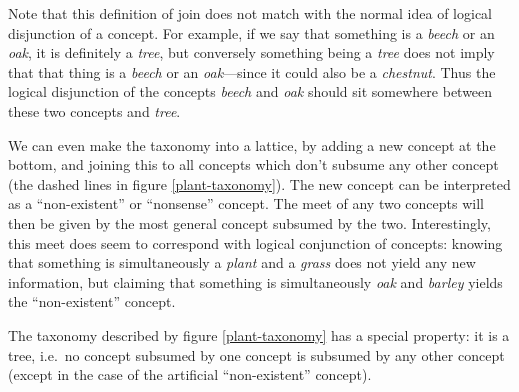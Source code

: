 \documentclass{report}
\begin{document}
Note that this definition of join does not match with the normal idea of logical disjunction of a concept. For example, if we say that something is a \emph{beech} or an \emph{oak}, it is definitely a \emph{tree}, but conversely something being a \emph{tree} does not imply that that thing is a \emph{beech} or an \emph{oak}---since it could also be a \emph{chestnut}. Thus the logical disjunction of the concepts \emph{beech} and \emph{oak} should sit somewhere between these two concepts and \emph{tree}.

We can even make the taxonomy into a lattice, by adding a new concept at the bottom, and joining this to all concepts which don't subsume any other concept (the dashed lines in figure \ref{plant-taxonomy}). The new concept can be interpreted as a ``non-existent'' or ``nonsense'' concept. The meet of any two concepts will then be given by the most general concept subsumed by the two. Interestingly, this meet does seem to correspond with logical conjunction of concepts: knowing that something is simultaneously a \emph{plant} and a \emph{grass} does not yield any new information, but claiming that something is simultaneously \emph{oak} and \emph{barley} yields the ``non-existent'' concept.

The taxonomy described by figure \ref{plant-taxonomy} has a special property: it is a tree, i.e.~no concept subsumed by one concept is subsumed by any other concept (except in the case of the artificial ``non-existent'' concept).
\end{document}
